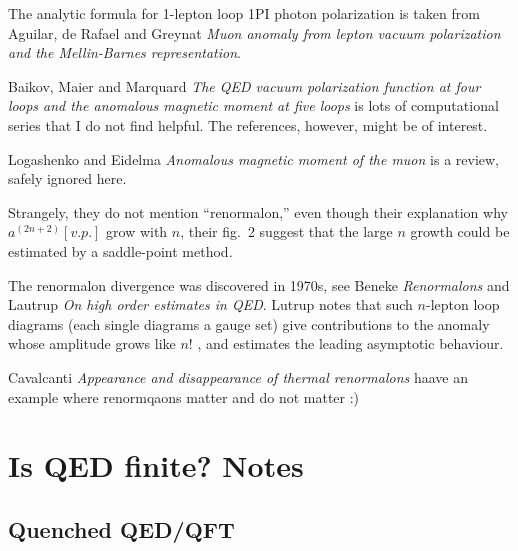 \begin{description}
The analytic formula for 1-lepton loop 1PI photon polarization is taken
from Aguilar, de Rafael and Greynat {\em Muon anomaly from
lepton vacuum polarization and the {Mellin-Barnes} representation}.

Baikov, Maier and Marquard {\em The {QED} vacuum
polarization function at four loops and the anomalous magnetic moment at
five loops} is lots of computational series that I do not find helpful.
The references, however, might be of interest.

Logashenko and Eidelma {\em Anomalous magnetic moment of the
muon} is a review, safely ignored here.

Strangely, they do not mention ``renormalon,'' even though their
explanation why $a^{(2n+2)}[v.p.]$ grow with $n$, their fig.~2 suggest
that the large $n$ growth could be estimated by a saddle-point method.

The renormalon divergence was discovered in 1970s, see
Beneke {\em Renormalons} and Lautrup {\em On
high order estimates in {QED}}. Lutrup notes that such $n$-lepton loop
diagrams (each single diagrams a gauge set) give contributions to the
anomaly whose amplitude grows like $n!$ , and estimates the leading
asymptotic behaviour.

Cavalcanti \etal{}
{\em Appearance and disappearance of thermal renormalons}
haave an example where renormqaons matter and do not matter :)




\end{description}

\newpage
\section{Is QED finite? Notes}
\label{sect:finiteBlog}

\subsection{Quenched QED/QFT}
\label{sect:quenched QE}

